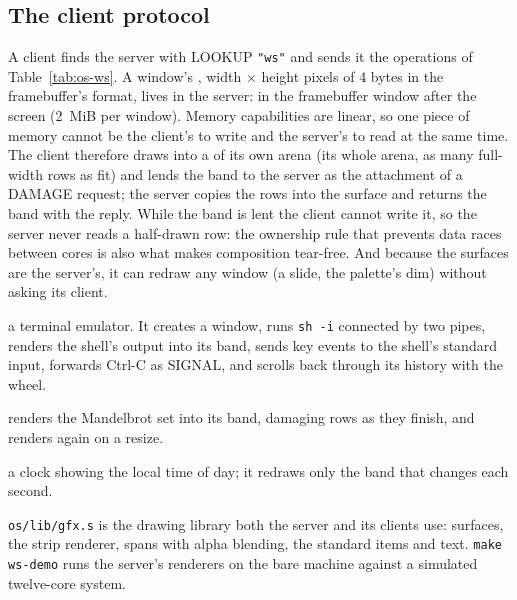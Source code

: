 \subsection{The client protocol}
A client finds the server with LOOKUP \texttt{"ws"} and sends it the operations of
Table~\ref{tab:os-ws}. A window's , width $\times$ height pixels of 4 bytes in the
framebuffer's format, lives in the server: in the framebuffer window after the screen (2~MiB per
window). Memory capabilities are linear, so one piece of memory cannot be the client's to write and
the server's to read at the same time. The client therefore draws into a  of its own arena
(its whole arena, as many full-width rows as fit) and lends the band to the server as the attachment
of a DAMAGE request; the server copies the rows into the surface and returns the band with the reply.
While the band is lent the client cannot write it, so the server never reads a half-drawn row: the
ownership rule that prevents data races between cores is also what makes composition tear-free. And
because the surfaces are the server's, it can redraw any window (a slide, the palette's dim) without
asking its client.



\begin{description}[leftmargin=1em,style=nextline]
\item[\texttt{term}] a terminal emulator. It creates a window, runs \texttt{sh -i} connected by two
  pipes, renders the shell's output into its band, sends key events to the shell's standard input,
  forwards Ctrl-C as SIGNAL, and scrolls back through its history with the wheel.
\item[\texttt{wmandel}] renders the Mandelbrot set into its band, damaging rows as they finish, and
  renders again on a resize.
\item[\texttt{wclock}] a clock showing the local time of day; it redraws only the band that changes each second.
\end{description}
\texttt{os/lib/gfx.s} is the drawing library both the server and its clients use: surfaces, the strip
renderer, spans with alpha blending, the standard items and text. \texttt{make ws-demo} runs the
server's renderers on the bare machine against a simulated twelve-core system.

